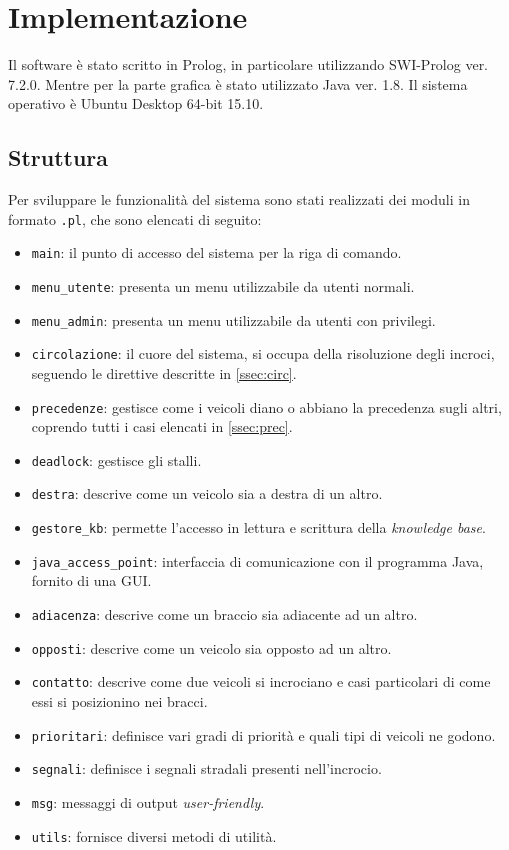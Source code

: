\chapter{Implementazione}

Il software è stato scritto in Prolog, in particolare utilizzando SWI-Prolog ver. 7.2.0. Mentre per la parte grafica è stato utilizzato Java ver. 1.8. Il sistema operativo è Ubuntu Desktop 64-bit 15.10.

\section{Struttura}
Per sviluppare le funzionalità del sistema sono stati realizzati dei moduli in formato \texttt{.pl}, che sono elencati di seguito:
\begin{itemize}
\item \texttt{main}: il punto di accesso del sistema per la riga di comando.
\item \texttt{menu\_utente}: presenta un menu utilizzabile da utenti normali.
\item \texttt{menu\_admin}: presenta un menu utilizzabile da utenti con privilegi.
\item \texttt{circolazione}: il cuore del sistema, si occupa della risoluzione degli incroci, seguendo le direttive descritte in \ref{ssec:circ}.
\item \texttt{precedenze}: gestisce come i veicoli diano o abbiano la precedenza sugli altri, coprendo tutti i casi elencati in \ref{ssec:prec}.
\item \texttt{deadlock}: gestisce gli stalli.
\item \texttt{destra}: descrive come un veicolo sia a destra di un altro.
\item \texttt{gestore\_kb}: permette l'accesso in lettura e scrittura della \emph{knowledge base}.
\item \texttt{java\_access\_point}: interfaccia di comunicazione con il programma Java, fornito di una GUI.
\item \texttt{adiacenza}: descrive come un braccio sia adiacente ad un altro.
\item \texttt{opposti}: descrive come un veicolo sia opposto ad un altro.
\item \texttt{contatto}: descrive come due veicoli si incrociano e casi particolari di come essi si posizionino nei bracci.
\item \texttt{prioritari}: definisce vari gradi di priorità e quali tipi di veicoli ne godono.
\item \texttt{segnali}: definisce i segnali stradali presenti nell'incrocio.
\item \texttt{msg}: messaggi di output \emph{user-friendly}.
\item \texttt{utils}: fornisce diversi metodi di utilità.
\end{itemize}

